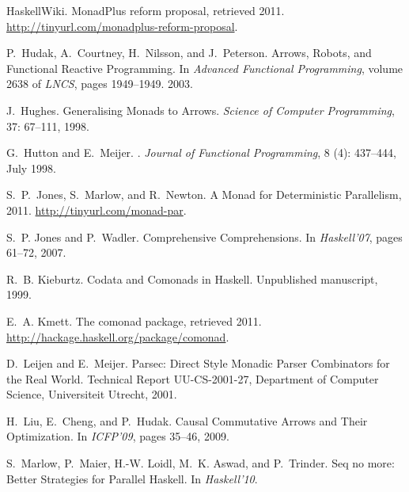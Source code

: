 \documentclass{sigplanconf}
\begin{document}
\begin{thebibliography}{37}
HaskellWiki.
\newblock MonadPlus reform proposal, retrieved 2011.
\newblock \url{http://tinyurl.com/monadplus-reform-proposal}.

P.~Hudak, A.~Courtney, H.~Nilsson, and J.~Peterson.
\newblock Arrows, Robots, and Functional Reactive Programming.
\newblock In \emph{Advanced Functional Programming}, volume 2638 of
  \emph{LNCS}, pages 1949--1949. 2003.

J.~Hughes.
\newblock Generalising Monads to Arrows.
\newblock \emph{Science of Computer Programming}, 37: 67--111, 1998.

G.~Hutton and E.~Meijer.
.
\newblock \emph{Journal of Functional Programming}, 8 (4):
  437--444, July 1998.

S.~P.~Jones, S.~Marlow, and R.~Newton.
\newblock A Monad for Deterministic Parallelism, 2011.
\newblock \url{http://tinyurl.com/monad-par}.

S.~P. Jones and P.~Wadler.
\newblock Comprehensive Comprehensions.
\newblock In \emph{Haskell'07}, pages 61--72, 2007.

R.~B. Kieburtz.
\newblock Codata and Comonads in Haskell.
\newblock Unpublished manuscript, 1999.

E.~A. Kmett.
\newblock The comonad package, retrieved 2011.
\newblock \url{http://hackage.haskell.org/package/comonad}.

D.~Leijen and E.~Meijer.
\newblock Parsec: Direct Style Monadic Parser Combinators for the Real World.
\newblock Technical Report UU-CS-2001-27, Department of Computer Science,
  Universiteit Utrecht, 2001.

H.~Liu, E.~Cheng, and P.~Hudak.
\newblock Causal Commutative Arrows and Their Optimization.
\newblock In \emph{ICFP'09}, pages 35--46, 2009.

S.~Marlow, P.~Maier, H.-W. Loidl, M.~K. Aswad, and P.~Trinder.
\newblock Seq no more: Better Strategies for Parallel Haskell.
\newblock In \emph{Haskell'10}.


\end{thebibliography}
\end{document}
